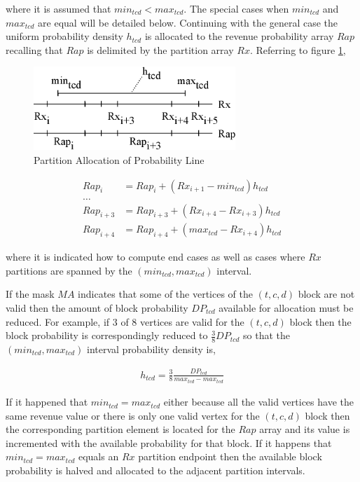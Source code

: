 where it is assumed that $min_{tcd} < max_{tcd}$. The special cases when $min_{tcd}$ and $max_{tcd}$ are equal will be detailed below. Continuing with the general case the uniform probability density $h_{tcd}$ is allocated to the revenue probability array $Rap$ recalling that $Rap$ is delimited by the partition array $Rx$. Referring to figure \ref{fig:line_projection},

\begin{figure}
  \centering
  \includegraphics[width=3in]{Images/line_projection}
  \caption[Partition Allocation of Probability Line]
          {Partition Allocation of Probability Line}
  \label{fig:line_projection}
\end{figure}

\begin{align*}
Rap_i &= Rap_i + (Rx_{i+1} - min_{tcd}) h_{tcd}\\
\dots\\
Rap_{i+3} &= Rap_{i+3} + (Rx_{i+4} - Rx_{i+3}) h_{tcd}\\
Rap_{i+4} &= Rap_{i+4} + (max_{tcd} - Rx_{i+4}) h_{tcd} 
\end{align*}

where it is indicated how to compute end cases as well as cases where $Rx$ partitions are spanned by the $(min_{tcd}, max_{tcd})$ interval. 

If the mask $MA$ indicates that some of the vertices of the $(t,c,d)$ block are not valid then the amount of block probability $DP_{tcd}$ available for allocation must be reduced. For example, if $3$ of $8$ vertices are valid for the $(t,c,d)$ block then the block probability is correspondingly reduced to $\frac{3}{8}DP_{tcd}$ so that the $(min_{tcd}, max_{tcd})$ interval probability density is,

\begin{align*}
h_{tcd} = \frac{3}{8}\frac{DP_{tcd}}{max_{tcd} - max_{tcd}}
\end{align*}

If it happened that $min_{tcd} = max_{tcd}$ either because all the valid vertices have the same revenue value or there is only one valid vertex for the $(t,c,d)$ block then the corresponding partition element is located for the $Rap$ array and its value is incremented with the available probability for that block. If it happens that $min_{tcd} = max_{tcd}$ equals an $Rx$ partition endpoint then the available block probability is halved and allocated to the adjacent partition intervals.

